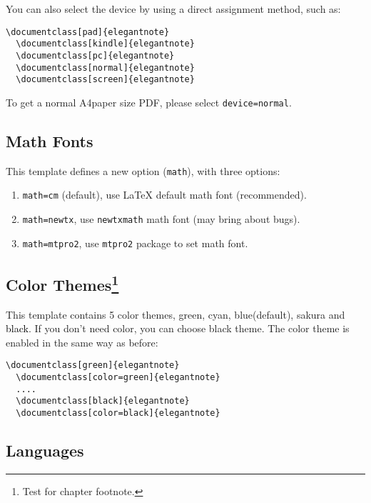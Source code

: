 \documentclass[en,hazy,blue,screen,14pt]{elegantnote}
\begin{document}
\begin{note}
You can also select the device by using a direct assignment method, such as:
\end{note}

\begin{lstlisting}[frame=none]  
  \documentclass[pad]{elegantnote}
  \documentclass[kindle]{elegantnote}
  \documentclass[pc]{elegantnote}
  \documentclass[normal]{elegantnote}
  \documentclass[screen]{elegantnote}
\end{lstlisting}

\begin{note}
To get a normal A4paper size PDF, please select \lstinline{device=normal}.
\end{note}

\subsection{Math Fonts}

This template defines a new option (\lstinline{math}), with three options:

\begin{enumerate}
  \item \lstinline{math=cm} (default), use \LaTeX{} default math font (recommended).
  \item \lstinline{math=newtx}, use \lstinline{newtxmath} math font (may bring about bugs).
  \item \lstinline{math=mtpro2}, use \lstinline{mtpro2} package to set math font.
\end{enumerate}

\newpage
\subsection[Color Themes]{Color Themes\footnote{Test for chapter footnote.}}

This template contains 5 color themes, \textcolor{egreen}{green}, \textcolor{ecyan}{cyan}, \textcolor{eblue}{blue}(default), \textcolor{sakura}{sakura} and \textcolor{black}{black}. If you don't need color, you can choose black theme. The color theme is enabled in the same way as before:
\begin{lstlisting}[frame=none]  
  \documentclass[green]{elegantnote}
  \documentclass[color=green]{elegantnote}
  ....
  \documentclass[black]{elegantnote}
  \documentclass[color=black]{elegantnote}
\end{lstlisting}


\subsection{Languages}
\end{document}
